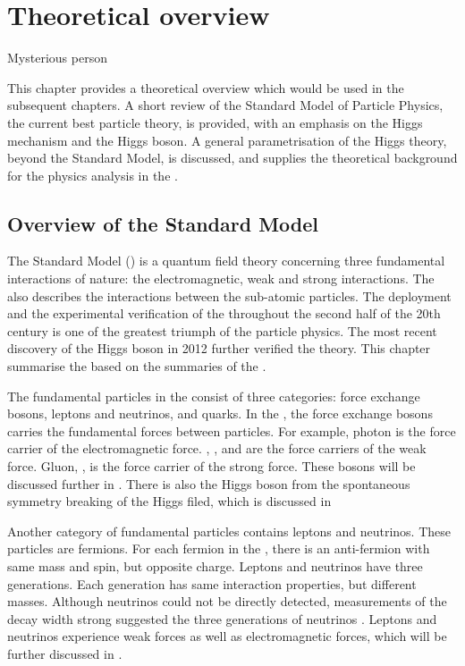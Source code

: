 \chapter{Theoretical overview}
\label{chap:Theory}

%
{Mysterious person}%

This chapter provides a theoretical overview which would be used in the subsequent  chapters. A short review of the Standard Model of Particle Physics, the current best particle theory, is provided, with an emphasis on the Higgs mechanism and the Higgs boson. A general parametrisation of the Higgs theory, beyond the Standard Model, is discussed, and supplies the theoretical background for the physics analysis in the .

\section{Overview of the Standard Model}

The Standard Model (\SM) is a quantum field theory concerning three fundamental interactions of nature: the electromagnetic, weak and strong interactions. The \SM also describes the interactions between the sub-atomic particles. The deployment and the experimental verification of the \SM throughout the second half of the 20th century is one of the greatest triumph of the particle physics. The most recent discovery of the Higgs boson in 2012 \cite{Aad:2012tfa} further verified the theory. This chapter summarise the \SM based on the summaries of the \SM \cite{Agashe:2014kda,Thomson:2013zua,Tong:QFT,Gripaios:GFT}.

The fundamental particles in the \SM consist of three categories: force exchange bosons, leptons and neutrinos, and quarks. In the \SM, the force exchange bosons carries the fundamental forces between particles. For example, photon is the force carrier of the electromagnetic force. \PWp, \PWm, and \PZ are the force carriers of the weak force. Gluon, \Pg, is the force carrier of the strong force. These bosons will be discussed further in . There is also the Higgs boson from the spontaneous symmetry breaking of the Higgs filed, which is discussed in 


Another category of fundamental particles contains leptons and neutrinos. These particles are fermions. For each fermion in the \SM, there is an anti-fermion with same mass and spin, but opposite charge. Leptons and neutrinos have three generations. Each generation has same interaction properties, but different masses. Although neutrinos could not be directly detected, measurements of the \PZ decay width strong suggested the three generations of neutrinos \cite{ALEPH:2005ab}. Leptons and neutrinos experience weak forces as well as electromagnetic forces, which will be further discussed in .

